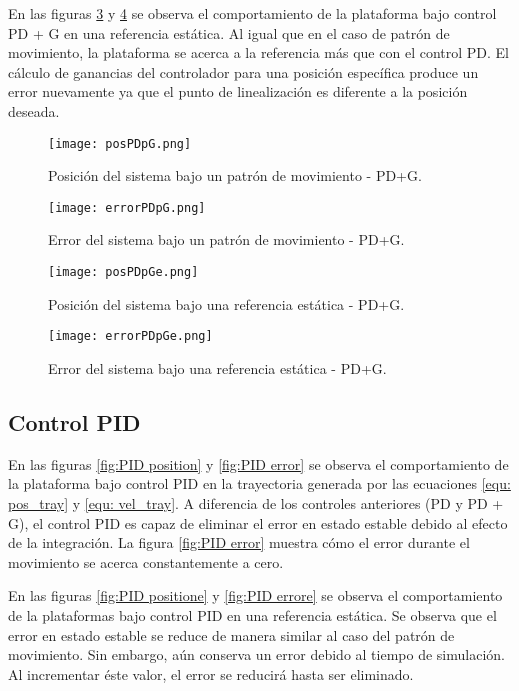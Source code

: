 En las figuras \ref{fig:PDG positione} y \ref{fig:PDG errore} se observa el comportamiento de la plataforma bajo control PD + G en una referencia estática. 
Al igual que en el caso de patrón de movimiento, la plataforma se acerca a la referencia más que con el control PD. 
El cálculo de ganancias del controlador para una posición específica
produce un error nuevamente ya que el punto de linealización es diferente a la posición deseada.


\begin{figure}[H]
    \centering
    \texttt{[image: posPDpG.png]}
    \caption{Posición del sistema bajo un patrón de movimiento - PD+G.}
    \label{fig:PDG position}
\end{figure}

\begin{figure}[H]
    \centering
    \texttt{[image: errorPDpG.png]}
    \caption{Error del sistema bajo un patrón de movimiento - PD+G.}
    \label{fig:PDG error}
\end{figure}

\begin{figure}[H]
    \centering
    \texttt{[image: posPDpGe.png]}
    \caption{Posición del sistema bajo una referencia estática - PD+G.}
    \label{fig:PDG positione}
\end{figure}

\begin{figure}[H]
    \centering
    \texttt{[image: errorPDpGe.png]}
    \caption{Error del sistema bajo una referencia estática - PD+G.}
    \label{fig:PDG errore}
\end{figure}



\subsection{Control PID}
En las figuras \ref{fig:PID position} y \ref{fig:PID error} se observa el comportamiento de la plataforma bajo control PID en la trayectoria generada por las ecuaciones \ref{equ: pos_tray} y \ref{equ: vel_tray}.
A diferencia de los controles anteriores (PD y PD + G), el control PID es capaz de eliminar el error en estado estable debido al efecto
de la integración. 
La figura \ref{fig:PID error} muestra cómo el error durante el movimiento se acerca constantemente a cero.

En las figuras \ref{fig:PID positione} y \ref{fig:PID errore} se observa el comportamiento de la plataformas bajo control PID en una referencia estática. 
Se observa que el error en estado estable se reduce de manera similar al caso del patrón de movimiento.
Sin embargo, aún conserva un error debido al tiempo de simulación. 
Al incrementar éste valor, el error se reducirá hasta ser eliminado.

